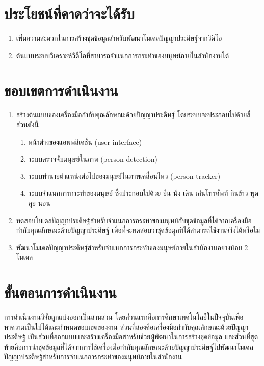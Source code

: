 
\section{ประโยชน์ที่คาดว่าจะได้รับ}
\begin{enumerate}
	\setlength\itemsep{-0.25em}
	\item เพิ่มความสะดวกในการสร้างชุดข้อมูลสำหรับพัฒนาโมเดลปัญญาประดิษฐ์จากวิดีโอ
	\item ต้นแบบระบบวิเคราะห์วิดีโอที่สามารถจำแนกการกระทำของมนุษย์ภายในสำนักงานได้
\end{enumerate}
\clearpage

\section{ขอบเขตการดำเนินงาน}
\begin{enumerate}
	\setlength\itemsep{-0.25em}
	\item สร้างต้นแบบของเครื่องมือกำกับคุณลักษณะด้วยปัญญาประดิษฐ์ โดยระบบจะประกอบไปด้วยสี่ส่วนดังนี้
	\begin{enumerate}
		\setlength\itemsep{-0.25em}
		\item หน้าต่างของแอพพลิเคชั่น (user interface)
		\item ระบบตรวจจับมนุษย์ในภาพ (person detection)
		\item ระบบทำนายตำแหน่งต่อไปของมนุษย์ในภาพเคลื่อนไหว (person tracker)
		\item ระบบจำแนกการกระทำของมนุษย์ ซึ่งประกอบไปด้วย ยืน นั่ง เดิน เล่นโทรศัพท์ กินข้าว พูดคุย นอน
	\end{enumerate}
	\item ทดสอบโมเดลปัญญาประดิษฐ์สำหรับจำแนกการกระทำของมนุษย์กับชุดข้อมูลที่ได้จากเครื่องมือกำกับคุณลักษณะด้วยปัญญาประดิษฐ์ เพื่อที่จะทดสอบว่าชุดข้อมูลที่ได้สามารถใช้งานจริงได้หรือไม่
	\item พัฒนาโมเดลปัญญาประดิษฐ์สำหรับจำแนกการกระทำของมนุษย์ภายในสำนักงานอย่างน้อย 2 โมเดล
\end{enumerate}

\section{ขั้นตอนการดำเนินงาน}
การดำเนินงานวิจัยถูกแบ่งออกเป็นสามส่วน โดยส่วนแรกคือการศึกษาเทคโนโลยีในปัจจุบันเพื่อหาความเป็นไปได้และกำหนดขอบเขตของงาน 
ส่วนที่สองคือเครื่องมือกำกับคุณลักษณะด้วยปัญญาประดิษฐ์ เป็นส่วนที่ออกแบบและสร้างเครื่องมือสำหรับช่วยผู้พัฒนาในการสร้างชุดข้อมูล 
และส่วนที่สุดท้ายคือการนำชุดข้อมูลที่ได้จากการใช้เครื่องมือกำกับคุณลักษณะด้วยปัญญาประดิษฐ์ไปพัฒนาโมเดลปัญญาประดิษฐ์สำหรับการจำแนกการกระทำของมนุษย์ภายในสำนักงาน
